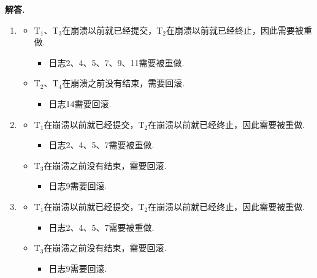 \documentclass[12pt, oneside]{ctexart}
\numberwithin{figure}{section}
\numberwithin{table}{section}
\newenvironment{solution}{\par\noindent\textbf{解答. }}{\par}
\begin{document}
\begin{solution}
\begin{enumerate}[(1)]
    \item
        \begin{itemize}
            \item T$_1$、T$_3$在崩溃以前就已经提交，T$_2$在崩溃以前就已经终止，因此需要被重做.
                \begin{itemize}
                    \item 日志2、4、5、7、9、11需要被重做.
                \end{itemize}
            \item T$_2$、T$_4$在崩溃之前没有结束，需要回滚.
                \begin{itemize}
                    \item 日志14需要回滚.
                \end{itemize}
        \end{itemize}
    \item 
        \begin{itemize}
            \item T$_1$在崩溃以前就已经提交，T$_2$在崩溃以前就已经终止，因此需要被重做.
                \begin{itemize}
                    \item 日志2、4、5、7需要被重做.
                \end{itemize}
            \item T$_3$在崩溃之前没有结束，需要回滚.
                \begin{itemize}
                    \item 日志9需要回滚.
                \end{itemize}
        \end{itemize}
    \item 
        \begin{itemize}
            \item T$_1$在崩溃以前就已经提交，T$_2$在崩溃以前就已经终止，因此需要被重做.
                \begin{itemize}
                    \item 日志2、4、5、7需要被重做.
                \end{itemize}
            \item T$_3$在崩溃之前没有结束，需要回滚.
                \begin{itemize}
                    \item 日志9需要回滚.
                \end{itemize}

\end{itemize}
\end{enumerate}
\end{solution}
\end{document}
